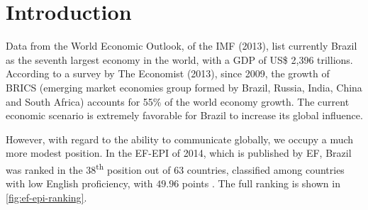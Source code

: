 \chapter{Introduction}\label{ch:introduction}
Data from the World Economic Outlook, of the IMF (2013), list currently Brazil as the seventh largest economy in the world, with a GDP of US\$ 2,396 trillions. According to a survey by The Economist (2013), since 2009, the growth of BRICS (emerging market economies group formed by Brazil, Russia, India, China and South Africa) accounts for 55\% of the world economy growth. The current economic scenario is extremely favorable for Brazil to increase its global influence.

However, with regard to the ability to communicate globally, we occupy a much more modest position. In the \ac{EF-EPI} of 2014, which is published by \ac{EF}, Brazil was ranked in the 38\textsuperscript{th} position out of 63 countries, classified among countries with low English proficiency, with $49.96$ points \cite{EF2014}. The full ranking is shown in \autoref{fig:ef-epi-ranking}.


